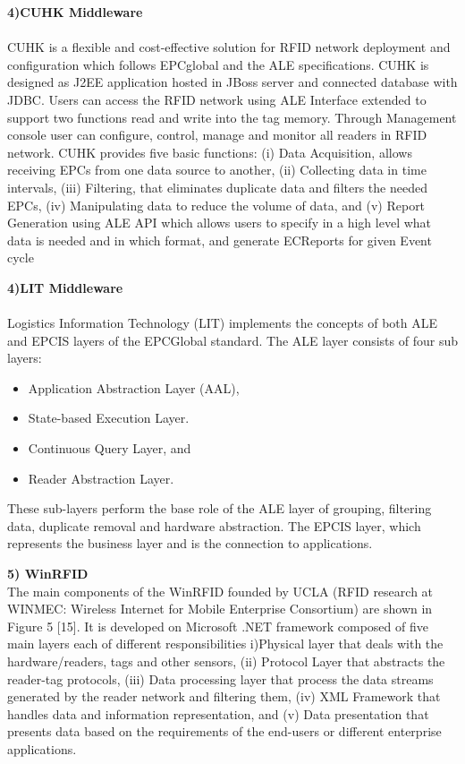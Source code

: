 \documentclass[a4paper,12pt]{article}
\begin{document}
\begin{multicols}{2}
\item\textbf{4)CUHK Middleware}\\
\\
CUHK  is a flexible and cost-effective solution for
RFID network deployment and configuration which follows
EPCglobal and the ALE specifications. CUHK is designed as
J2EE application hosted in JBoss server and connected
database with JDBC. Users can access the RFID network
using ALE Interface extended to support two functions read
and write into the tag memory. Through Management console
user can configure, control, manage and monitor all readers
in RFID network. CUHK provides five basic functions: (i)
Data Acquisition, allows receiving EPCs from one data
source to another, (ii) Collecting data in time intervals, (iii)
Filtering, that eliminates duplicate data and filters the needed
EPCs, (iv) Manipulating data to reduce the volume of data,
and (v) Report Generation using ALE API which allows
users to specify in a high level what data is needed and in
which format, and generate ECReports for given Event cycle

\item\textbf{4)LIT Middleware}\\
\\
Logistics Information Technology (LIT)  implements
the concepts of both ALE and EPCIS layers of the EPCGlobal standard. The ALE layer consists of four sub layers:
\begin{itemize}
\item  Application Abstraction Layer (AAL),
\item  State-based Execution Layer.
\item  Continuous Query Layer, and
\item  Reader Abstraction Layer.
\end{itemize}

These sub-layers perform the base role of the ALE layer of
grouping, filtering data, duplicate removal and hardware
abstraction. The EPCIS layer, which represents the business
layer and is the connection to applications.

\item\textbf{5) WinRFID}
\\
The main components of the WinRFID founded by
UCLA (RFID research at WINMEC: Wireless Internet for
Mobile Enterprise Consortium) are shown in Figure 5 [15]. It
is developed on Microsoft .NET framework composed of
five main layers each of different responsibilities
i)Physical layer that deals with the hardware/readers, tags and
other sensors, 
(ii) Protocol Layer that abstracts the reader-tag
protocols, 
(iii) Data processing layer that process the data
streams generated by the reader network and filtering them,
(iv) XML Framework that handles data and information
representation, and 
(v) Data presentation that presents data
based on the requirements of the end-users or different
enterprise applications.


\end{multicols}
\end{document}
